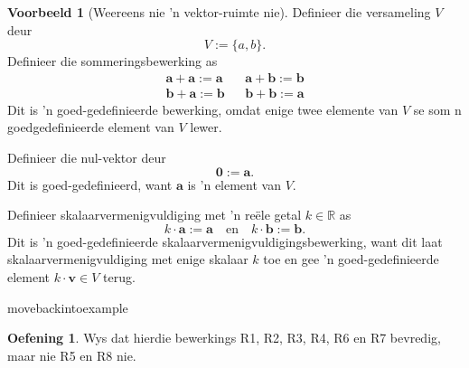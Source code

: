 \documentclass[a4paper,11pt]{book}
\theoremstyle{definition}
\newtheorem{exercise}{Oefening}
\newtheorem{example_environment}{Voorbeeld}[chapter]
\newcommand{\be}{\begin{equation}}
\newcommand{\ee}{\end{equation}}
\newcommand{\ve}[1]{\mathbf{#1}}
\newenvironment{example}
	{
		\begin{oframed}
		\begin{example_environment}
	}
	{
		\end{example_environment}
		\end{oframed}
	}
\begin{document}
\begin{example}[Weereens nie 'n vektor-ruimte nie] Definieer die
	versameling $V$ deur
	\be
	V := \{ a, b \} .
	\ee
	Definieer die sommeringsbewerking as
	\begin{align}
		\ve{a} + \ve{a} := \ve{a} && \ve{a} + \ve{b} := \ve{b}
		\label{ne_11} \\
		\ve{b} + \ve{a} := \ve{b} && \ve{b} + \ve{b} := \ve{a}
		\label{ne_12}
	\end{align}
	Dit is 'n goed-gedefinieerde bewerking, omdat enige twee elemente van
	$V$ se som n goedgedefinieerde element van $V$ lewer.

	Definieer die nul-vektor deur
	\be
	\ve{0} := \ve{a}. \label{ne_13}
	\ee
	Dit is goed-gedefinieerd, want $\ve{a}$ is 'n element van $V$.

	Definieer skalaarvermenigvuldiging met 'n re{\"e}le getal $k \in
	\mathbb{R}$ as
	\be
	k \cdot \ve{a} := \ve{a} \quad \mbox{en} \quad k \cdot \ve{b} :=
	\ve{b}. \label{ne_14}
	\ee
	Dit is 'n goed-gedefinieerde skalaarvermenigvuldigingsbewerking, want
	dit laat skalaarvermenigvuldiging met enige skalaar $k$ toe en gee 'n
	goed-gedefinieerde element $k \cdot \ve{v} \in V$ terug.

\end{example}
movebackintoexample
	\begin{exercise}
	Wys dat hierdie bewerkings R1, R2, R3, R4, R6 en R7 bevredig, maar
	nie R5 en R8 nie.
\end{exercise}
\end{document}
